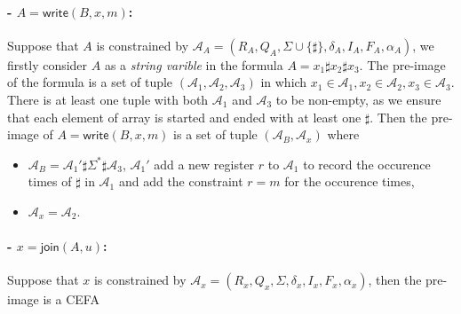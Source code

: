 \documentclass[12pt]{article}
\newcommand*{\aut}{\mathcal{A}}
\newcommand{\arrconcat}{\sharp}
\newcommand{\myjoin}{\mathsf{join}}
\newcommand{\mywrite}{\mathsf{write}}
\theoremstyle{remark}
\begin{document}
\paragraph{- $A = \mywrite(B, x, m)$:} Suppose that $A$ is constrained by $\aut_A=(R_A, Q_A, \Sigma\cup\{\arrconcat\}, \delta_A, I_A, F_A, \alpha_A)$, we firstly consider $A$ as a \emph{string varible} in the formula $A = x_1\arrconcat x_2\arrconcat x_3$. The pre-image of the formula is a set of tuple $(\aut_1, \aut_2, \aut_3)$ in which $x_1\in \aut_1, x_2\in \aut_2, x_3\in \aut_3$. There is at least one tuple with both $\aut_1$ and $\aut_3$ to be non-empty, as we ensure that each element of array is started and ended with at least one $\arrconcat$. Then the pre-image of $A = \mywrite(B, x, m)$ is a set of tuple $(\aut_B, \aut_x)$ where
\begin{itemize}
    \item $\aut_B = \aut_1'\arrconcat\Sigma^*\arrconcat\aut_3$, $\aut_1'$ add a new register $r$ to $\aut_1$ to record the occurence times of $\arrconcat$ in $\aut_1$ and add the constraint $r = m$ for the occurence times,
    \item $\aut_x = \aut_2$.
\end{itemize}

\paragraph{- $x = \myjoin(A,u)$:} Suppose that $x$ is constrained by $\aut_x=(R_x, Q_x, \Sigma, \delta_x, I_x, F_x, \alpha_x)$, then the pre-image is a CEFA



\end{document}
